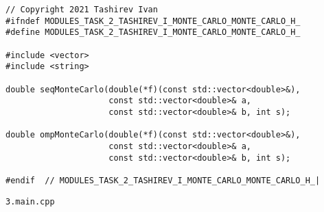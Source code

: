 \documentclass{report}
\begin{document}
\begin{lstlisting}
// Copyright 2021 Tashirev Ivan
#ifndef MODULES_TASK_2_TASHIREV_I_MONTE_CARLO_MONTE_CARLO_H_
#define MODULES_TASK_2_TASHIREV_I_MONTE_CARLO_MONTE_CARLO_H_

#include <vector>
#include <string>

double seqMonteCarlo(double(*f)(const std::vector<double>&),
                     const std::vector<double>& a,
                     const std::vector<double>& b, int s);

double ompMonteCarlo(double(*f)(const std::vector<double>&),
                     const std::vector<double>& a,
                     const std::vector<double>& b, int s);

#endif  // MODULES_TASK_2_TASHIREV_I_MONTE_CARLO_MONTE_CARLO_H_|
\end{lstlisting}
\par \verb|3.main.cpp|
\end{document}
